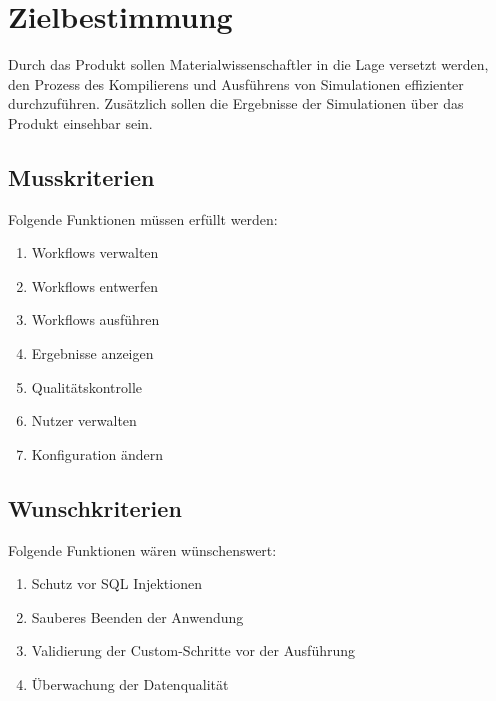 \chapter{Zielbestimmung}
Durch das Produkt sollen Materialwissenschaftler in die Lage versetzt werden, den Prozess des Kompilierens und Ausführens von Simulationen effizienter durchzuführen. 
Zusätzlich sollen die Ergebnisse der Simulationen über das Produkt einsehbar sein. \newline
\section{Musskriterien}
Folgende Funktionen müssen erfüllt werden:
\renewcommand{\labelenumi}{/M\arabic{enumi}0/}
\begin{enumerate}
    \setlength\itemsep{-1em}
    \item Workflows verwalten
    \item Workflows entwerfen %
    \item Workflows ausführen
    \item Ergebnisse anzeigen
    \item Qualitätskontrolle
    \item Nutzer verwalten
    \item Konfiguration ändern
\end{enumerate}
\newpage
\section{Wunschkriterien}
Folgende Funktionen wären wünschenswert:
\renewcommand{\labelenumi}{/W\arabic{enumi}0/}
\begin{enumerate}
    \setlength\itemsep{-1em}
    \item Schutz vor SQL Injektionen
    \item Sauberes Beenden der Anwendung
    \item Validierung der Custom-Schritte vor der Ausführung
    \item Überwachung der Datenqualität
\end{enumerate}

